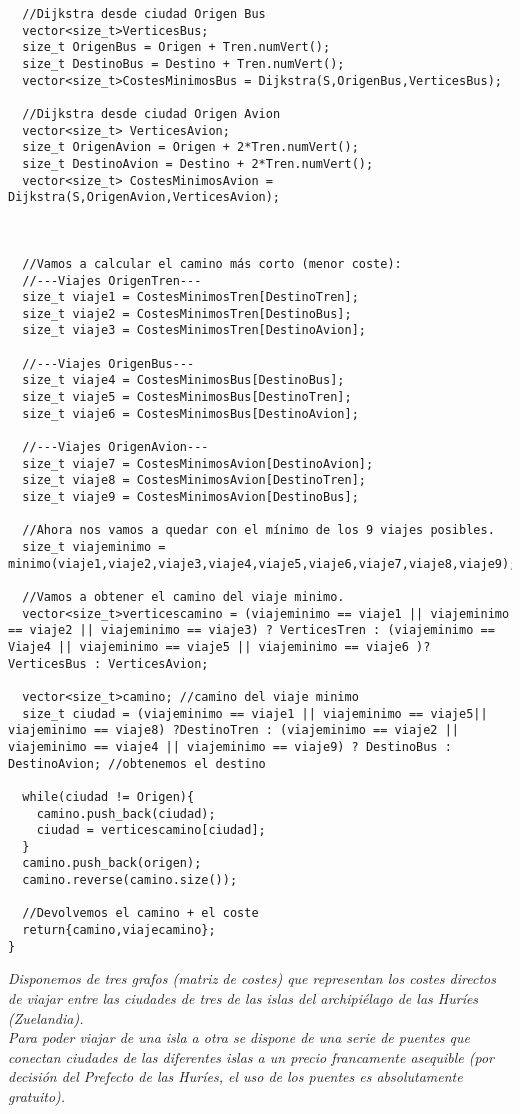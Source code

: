 \begin{verbatim}
  //Dijkstra desde ciudad Origen Bus
  vector<size_t>VerticesBus;
  size_t OrigenBus = Origen + Tren.numVert();
  size_t DestinoBus = Destino + Tren.numVert();
  vector<size_t>CostesMinimosBus = Dijkstra(S,OrigenBus,VerticesBus);

  //Dijkstra desde ciudad Origen Avion
  vector<size_t> VerticesAvion;
  size_t OrigenAvion = Origen + 2*Tren.numVert();
  size_t DestinoAvion = Destino + 2*Tren.numVert();
  vector<size_t> CostesMinimosAvion = Dijkstra(S,OrigenAvion,VerticesAvion);



  //Vamos a calcular el camino más corto (menor coste):
  //---Viajes OrigenTren---
  size_t viaje1 = CostesMinimosTren[DestinoTren];
  size_t viaje2 = CostesMinimosTren[DestinoBus];
  size_t viaje3 = CostesMinimosTren[DestinoAvion];

  //---Viajes OrigenBus---
  size_t viaje4 = CostesMinimosBus[DestinoBus];
  size_t viaje5 = CostesMinimosBus[DestinoTren];
  size_t viaje6 = CostesMinimosBus[DestinoAvion];

  //---Viajes OrigenAvion---
  size_t viaje7 = CostesMinimosAvion[DestinoAvion];
  size_t viaje8 = CostesMinimosAvion[DestinoTren];
  size_t viaje9 = CostesMinimosAvion[DestinoBus];

  //Ahora nos vamos a quedar con el mínimo de los 9 viajes posibles.
  size_t viajeminimo = minimo(viaje1,viaje2,viaje3,viaje4,viaje5,viaje6,viaje7,viaje8,viaje9);

  //Vamos a obtener el camino del viaje minimo.
  vector<size_t>verticescamino = (viajeminimo == viaje1 || viajeminimo == viaje2 || viajeminimo == viaje3) ? VerticesTren : (viajeminimo == Viaje4 || viajeminimo == viaje5 || viajeminimo == viaje6 )? VerticesBus : VerticesAvion;

  vector<size_t>camino; //camino del viaje minimo
  size_t ciudad = (viajeminimo == viaje1 || viajeminimo == viaje5|| viajeminimo == viaje8) ?DestinoTren : (viajeminimo == viaje2 || viajeminimo == viaje4 || viajeminimo == viaje9) ? DestinoBus : DestinoAvion; //obtenemos el destino

  while(ciudad != Origen){
    camino.push_back(ciudad);
    ciudad = verticescamino[ciudad];
  }
  camino.push_back(origen);
  camino.reverse(camino.size());

  //Devolvemos el camino + el coste
  return{camino,viajecamino};
}
\end{verbatim}

\textbf{\large{}}\textit{ Disponemos de tres grafos (matriz de costes) que representan los costes directos de viajar entre las ciudades de tres de las islas del archipiélago de las Huríes (Zuelandia).\\Para poder viajar de una isla a otra se dispone de una serie de puentes que conectan ciudades de las diferentes islas a un precio francamente asequible (por decisión del Prefecto de las Huríes, el uso de los puentes es absolutamente gratuito).}

